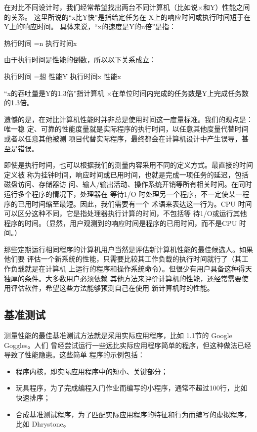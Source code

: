 在对比不同设计时，我们经常希望找出两台不同计算机（比如说×和Y）性能之间的关系。
这里所说的“x比Y快”是指给定任务在 X上的响应时间或执行时间短于在Y上的响应时间。
具体来说，“x的速度是Y的n倍”是指：

热行时间 =n
执行时间x

由于执行时间是性能的倒数，所以以下关系成立：

执行时间 =想
性能Y
执行时间x
性能x

“x的吞吐量是Y的1.3倍”指计算机 ×在单位时间内完成的任务数是Y上完成任务数的1.3倍。

遗憾的是，在对比计算机性能时并非总是使用时间这一度量标准。我们的观点是：唯一稳
定、可靠的性能度量就是实际程序的执行时间，以任意其他度量代替时间或者以任意其他被测
项目代替实际程序，最终都会在计算机设计中产生误导，甚至是错误。

即使是执行时间，也可以根据我们的测量内容采用不同的定义方式。最直接的时间定义被
称为挂钟时间，响应时间或已用时间，也就是完成一项任务的延迟，包括磁盘访问、存储器访
问、输人/输出活动、操作系统开销等所有相关时间。在同时运行多个程序的情况下，处理器在
等待1/O 时处理另一个程序，不一定使某一程序的已用时间缩至最短。因此，我们需要有一个
术语来表达这一行为。CPU 时间可以区分这种不同，它是指处理器执行计算的时间，不包括等
待1/O或运行其他程序的时间。（显然，用户观测到的响应时间是程序的已用时间，而不是CPU
时间。）

那些定期运行相同程序的计算机用户当然是评估新计算机性能的最佳候选人。如果他们要
评估一个新系统的性能，只需要比较其工作负载的执行时间就行了（其工作负载就是在计算机
上运行的程序和操作系统命令）。但很少有用户具备这种得天独厚的条件。大多数用户必须依赖
其他方法来评价计算机的性能，还经常需要使用评估软件，希望这些方法能够预测自己在使用
新计算机时的性能。

\subsection{基准测试}
测量性能的最佳基准测试方法就是采用实际应用程序，比如 1.1节的 Google Goggles。人们
曾经尝试运行一些远比实际应用程序简单的程序，但这种做法已经导致了性能隐患。这些简单
程序的示例包括：

\begin{itemize}
    \item 程序内核，即实际应用程序中的短小、关键部分；
    \item 玩具程序，为了完成编程入门作业而编写的小程序，通常不超过100行，比如快速排序；
    \item 合成基准测试程序，为了匹配实际应用程序的特征和行为而编写的虚拟程序，比如
    Dhrystone。
\end{itemize}

